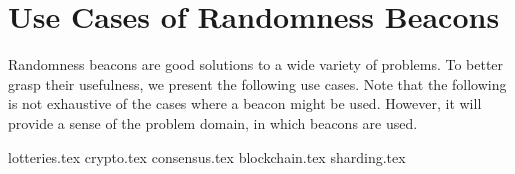 \section{Use Cases of Randomness Beacons}\label{sec:use_cases_of_randomness_beacons}
Randomness beacons are good solutions to a wide variety of problems. To better grasp their usefulness, we present the following use cases. Note that the following is not exhaustive of the cases where a beacon might be used. However, it will provide a sense of the problem domain, in which beacons are used.


{lotteries.tex}
{crypto.tex}
{consensus.tex}
{blockchain.tex}
{sharding.tex}
